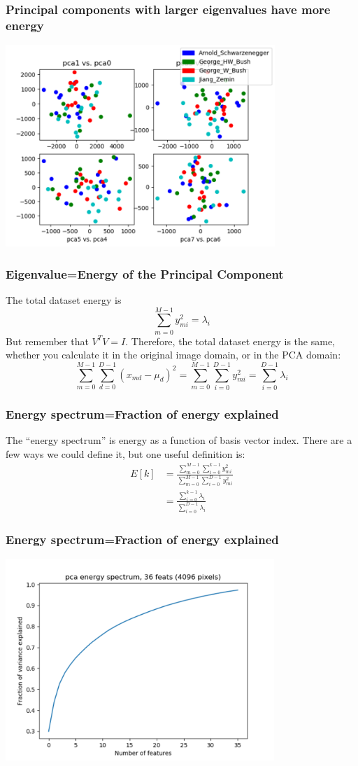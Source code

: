 \documentclass{beamer}
\begin{document}
\begin{frame}
  \frametitle{Principal components with larger eigenvalues have more energy}
  \centerline{\includegraphics[height=3in]{pca_samples.png}}
\end{frame}

\begin{frame}
  \frametitle{Eigenvalue=Energy of the Principal Component}
  The total dataset energy is
  \[
  \sum_{m=0}^{M-1}y_{mi}^2=\lambda_i
  \]
  But remember that $V^TV=I$.  Therefore, the total dataset energy
  is the same, whether you calculate it in the original image
  domain, or in the PCA domain:
  \[
  \sum_{m=0}^{M-1}\sum_{d=0}^{D-1}(x_{md}-\mu_d)^2
  =\sum_{m=0}^{M-1}\sum_{i=0}^{D-1}y_{mi}^2=\sum_{i=0}^{D-1}\lambda_i
  \]
\end{frame}

\begin{frame}
  \frametitle{Energy  spectrum=Fraction of energy explained}
  The ``energy spectrum'' is energy as a function of
  basis vector index.  There are a few ways we could define it,
  but one useful definition is:
  \begin{align*}
    E[k] &=\frac{\sum_{m=0}^{M-1}\sum_{i=0}^{k-1}y_{mi}^2}
    {\sum_{m=0}^{M-1}\sum_{i=0}^{D-1}y_{mi}^2}\\
    &=\frac{\sum_{i=0}^{k-1}\lambda_i}{\sum_{i=0}^{D-1}\lambda_i}
  \end{align*}
\end{frame}

\begin{frame}
  \frametitle{Energy  spectrum=Fraction of energy explained}
  \centerline{\includegraphics[height=3in]{energy_spectrum.png}}
\end{frame}
\end{document}
